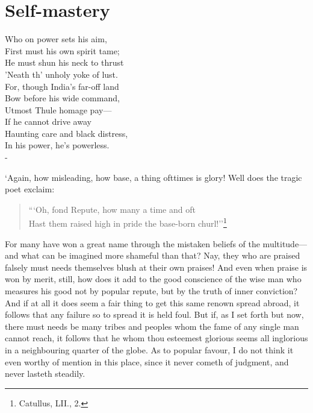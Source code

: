 \documentclass[12pt]{book}
\newenvironment{ipoem}[1]%
  {\setcounter{poemindentevery}{#1}\begin{poem}\small}%
  {\end{poem}\setcounter{poemindentevery}{0}}
\begin{document}

\section{Self-mastery}

\begin{ipoem}{0}
    Who on power sets his aim, \\
    First must his own spirit tame; \\
    He must shun his neck to thrust \\
    'Neath th' unholy yoke of lust. \\
    For, though India's far-off land \\
    Bow before his wide command, \\
    Utmost Thule homage pay--- \\
    If he cannot drive away \\
    Haunting care and black distress, \\
    In his power, he's powerless. \\-
\end{ipoem}

`Again, how misleading, how base, a thing ofttimes is glory! Well does
the tragic poet exclaim:

\begin{quote}
    ```Oh, fond Repute, how many a time and oft \\
    Hast them raised high in pride the base-born churl!''\footnote{Catullus, LII., 2.}
\end{quote}

For many have won a great name through the mistaken beliefs of the
multitude---and what can be imagined more shameful than that? Nay, they
who are praised falsely must needs themselves blush at their own
praises! And even when praise is won by merit, still, how does it add to
the good conscience of the wise man who measures his good not by popular
repute, but by the truth of inner conviction? And if at all it does seem
a fair thing to get this same renown spread abroad, it follows that any
failure so to spread it is held foul. But if, as I set forth but now,
there must needs be many tribes and peoples whom the fame of any single
man cannot reach, it follows that he whom thou esteemest glorious seems
all inglorious in a neighbouring quarter of the globe. As to popular
favour, I do not think it even worthy of mention in this place, since it
never cometh of judgment, and never lasteth steadily.
\end{document}

